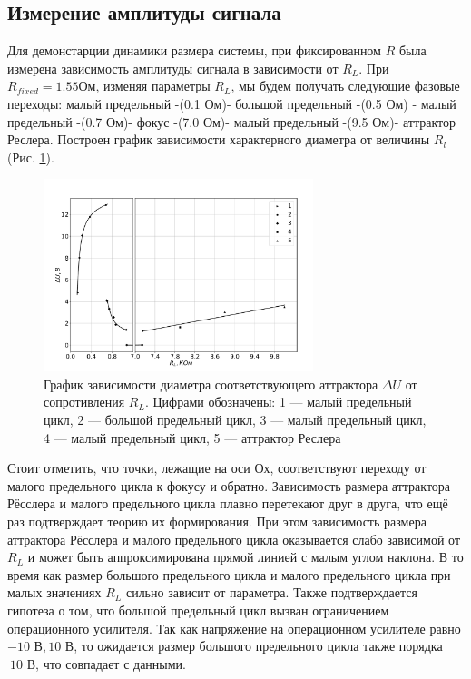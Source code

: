 \documentclass[12pt]{article}
\begin{document}
\subsection*{Измерение амплитуды сигнала }
Для демонстарции динамики размера системы, при фиксированном $R$ была измерена зависимость
амплитуды сигнала в зависимости от $R_L$.
При $R_{fixed} = 1.55 \text{Ом}$, изменяя параметры $R_L$, мы будем получать следующие фазовые переходы: малый предельный -(0.1 Ом)- большой предельный -(0.5 Ом) - малый предельный -(0.7 Ом)- фокус -(7.0 Ом)- малый предельный -(9.5 Ом)- аттрактор Реслера.
Построен график зависимости характерного диаметра от величины $R_l$ (Рис. \ref{fig:amplitudes_fix_R}).
\begin{figure}[H]
	\centering
	\includegraphics[width=0.7\textwidth]{Size_RL.pdf}
	\caption{График зависимости диаметра соответствующего аттрактора $\Delta U$ от сопротивления $R_L$. 
	Цифрами обозначены: 1 --- малый предельный цикл, 2 --- большой предельный цикл, 3 --- малый предельный цикл, 4 --- малый предельный цикл, 5 --- аттрактор Реслера}
	\label{fig:amplitudes_fix_R}
\end{figure}

Стоит отметить, что точки, лежащие на оси Ох, 
соответствуют переходу от малого предельного цикла к фокусу и обратно. Зависимость размера аттрактора Рёсслера и малого предельного цикла плавно 
перетекают друг в друга, что ещё раз подтверждает теорию их формирования. При этом зависимость размера аттрактора Рёсслера и малого предельного 
цикла оказывается слабо зависимой от $R_L$ и может быть аппроксимирована прямой линией с малым углом наклона. В то время как 
размер большого предельного цикла и малого предельного цикла при малых значениях $R_L$ сильно зависит от параметра. 
Также подтверждается гипотеза о том, что большой предельный цикл вызван ограничением операционного усилителя. 
Так как напряжение на операционном усилителе равно $-10\text{ В}, 10\text{ В}$, 
то ожидается размер большого предельного цикла также порядка $~10\text{ В}$, что совпадает с данными.     
\end{document}
